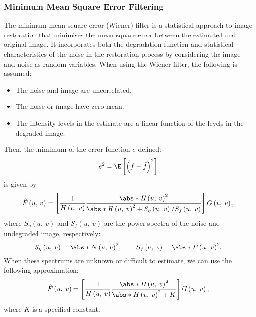 \documentclass{article}
\begin{document}
\subsubsection{Minimum Mean Square Error Filtering}
The minimum mean square error (Wiener) filter is a statistical approach
to image restoration that minimises the mean square error between the
estimated and original image. It incorporates both the degradation
function and statistical characteristics of the noise in the
restoration process by considering the image and noise as random
variables. When using the Wiener filter, the following is assumed:
\begin{itemize}
    \item The noise and image are uncorrelated.
    \item The noise or image have zero mean.
    \item The intensity levels in the estimate are a linear function of
          the levels in the degraded image.
\end{itemize}
Then, the mimimum of the error function \(e\) defined:
\begin{equation*}
    e^2 = \E\left[ \left( f - \hat{f} \right)^2 \right]
\end{equation*}
is given by
\begin{equation*}
    \hat{F}\left( u,\: v \right) = \left[ \frac{1}{H\left( u,\: v \right)} \frac{\abs*{H\left( u,\: v \right)}^2}{\abs*{H\left( u,\: v \right)}^2 + S_\eta\left( u,\: v \right) / S_f\left( u,\: v \right)} \right] G\left( u,\: v \right),
\end{equation*}
where \(S_\eta\left( u,\: v \right)\) and \(S_f\left( u,\: v \right)\)
are the power spectra of the noise and undegraded image, respectively:
\begin{equation*}
    S_\eta\left( u,\: v \right) = \abs*{N\left( u,\: v \right)}^2, \qquad S_f\left( u,\: v \right) = \abs*{F\left( u,\: v \right)}^2.
\end{equation*}
When these spectrums are unknown or difficult to estimate, we can use
the following approximation:
\begin{equation*}
    \hat{F}\left( u,\: v \right) = \left[ \frac{1}{H\left( u,\: v \right)} \frac{\abs*{H\left( u,\: v \right)}^2}{\abs*{H\left( u,\: v \right)}^2 + K} \right] G\left( u,\: v \right),
\end{equation*}
where \(K\) is a specified constant.
\end{document}
